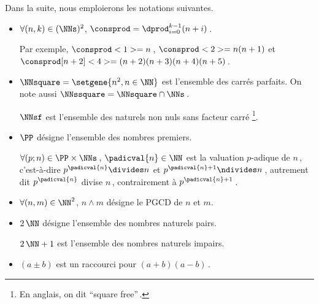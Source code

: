 Dans la suite, nous emploierons les notations suivantes.
%
\begin{itemize}
	\item $\forall (n, k) \in ( \NNs )^2$, $\consprod = \dprod_{i = 0}^{k-1} (n + i)$\,. 
	
	\noindent
	Par exemple,
	$\consprod<1> = n$\,,
	$\consprod<2> = n (n+1)$
	et
	$\consprod[n+2]<4> = (n+2) (n+3) (n+4) (n+5)$\,.


	\medskip
	\item $\NNsquare = \setgene{n^2, n \in \NN}$ est l'ensemble des carrés parfaits.
	On note aussi $\NNssquare = \NNsquare \cap \NNs$\,.

	\noindent
	$\NNsf$ est l'ensemble des naturels non nuls sans facteur carré
	\footnote{
		En anglais, on dit \enquote{square free}\,.
	}.


	\medskip
	\item $\PP$ désigne l'ensemble des nombres premiers.
	
	\noindent
	$\forall (p ; n) \in \PP \times \NNs$\,, $\padicval{n} \in \NN$ est la valuation $p$-adique de $n$\,,
	c'est-à-dire 
	$p^{\padicval{n}} \divides n$ et $p^{\padicval{n} + 1} \ndivides n$\,,
	autrement dit
	$p^{\padicval{n}}$ divise $n$\,, contrairement à $p^{\padicval{n} + 1}$\,.


	\medskip
	\item $\forall (n , m) \in \NN^2$, $n \wedge m$ désigne le PGCD de $n$ et $m$.

	
	\medskip
	\item $2\,\NN$ désigne l'ensemble des nombres naturels pairs.
	
	\noindent
	$2\,\NN + 1$ est l'ensemble des nombres naturels impairs.


	\medskip
	\item $(a \pm b)$ est un raccourci pour $(a + b) (a - b)$\,.
\end{itemize}